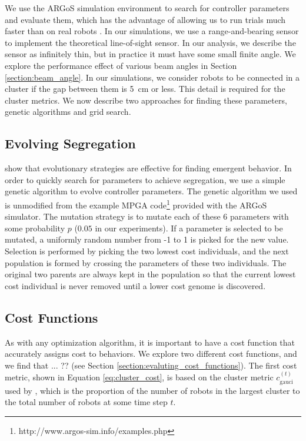 \documentclass[conference]{IEEEtran}
\begin{document}
    We use the ARGoS simulation environment to search for controller parameters and evaluate them, which has the advantage of allowing us to run trials much faster than on real robots \cite{pinciroli_argos:_2012}. In our simulations, we use a range-and-bearing sensor to implement the theoretical line-of-sight sensor. In our analysis, we describe the sensor as infinitely thin, but in practice it must have some small finite angle. We explore the performance effect of various beam angles in Section \ref{section:beam_angle}. In our simulations, we consider robots to be connected in a cluster if the gap between them is \SI{5}{\centi\meter} or less. This detail is required for the cluster metrics. We now describe two approaches for finding these parameters, genetic algorithms and grid search.

  \subsection{Evolving Segregation}

    \cite{bahgeci_evolving_2005}\cite{johnson_evolving_2016}\cite{dorigo_evolving_2004} show that evolutionary strategies are effective for finding emergent behavior. In order to quickly search for parameters to achieve segregation, we use a simple genetic algorithm to evolve controller parameters. The genetic algorithm we used is unmodified from the example MPGA code\footnote{http://www.argos-sim.info/examples.php} provided with the ARGoS simulator. The mutation strategy is to mutate each of these 6 parameters with some probability $p$ ($0.05$ in our experiments). If a parameter is selected to be mutated, a uniformly random number from -1 to 1 is picked for the new value. Selection is performed by picking the two lowest cost individuals, and the next population is formed by crossing the parameters of these two individuals. The original two parents are always kept in the population so that the current lowest cost individual is never removed until a lower cost genome is discovered.

  \subsection{Cost Functions}

    As with any optimization algorithm, it is important to have a cost function that accurately assigns cost to behaviors. We explore two different cost functions, and we find that ... ?? (see Section \ref{section:evaluting_cost_functions}). The first cost metric, shown in Equation \eqref{eq:cluster_cost}, is based on the cluster metric $c_{\text{gauci}}^{(t)}$ used by \cite{gauci_self-organized_2014}, which is the proportion of the number of robots in the largest cluster to the total number of robots at some time step $t$.
\end{document}

